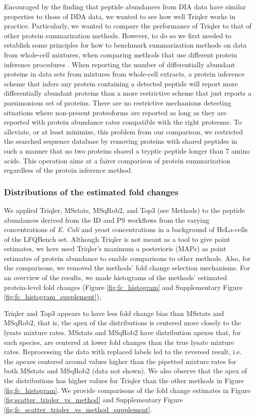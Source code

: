 \documentclass[10pt,letterpaper]{article}
\begin{document}
Encouraged by the finding that peptide abundances from DIA data have similar properties to those of DDA data, we wanted to see how well Triqler works in practice. Particularly, we wanted to compare the performance of Triqler to that of other protein summarization methods. However, to do so we first needed to establish some principles for how to benchmark summarization methods on data from whole-cell mixtures, when comparing methods that use different protein inference procedures \cite{serang2012recognizing}. When reporting the number of differentially abundant proteins in data sets from mixtures from whole-cell extracts, a protein inference scheme that infers any protein containing a detected peptide will report more differentially abundant proteins than a more restrictive scheme that just reports a parsimonious set of proteins. There are no restrictive mechanisms detecting situations where non-present proteoforms are reported as long as they are reported with protein abundance rates compatible with the right proteome. To alleviate, or at least minimize, this problem from our comparison, we restricted the searched sequence database by removing proteins with shared peptides in such a manner that no two proteins shared a tryptic peptide longer than 7 amino acids. This operation aims at a fairer comparison of protein summarization regardless of the protein inference method. 

\subsubsection*{Distributions of the estimated fold changes}

We applied Triqler, MSstats, MSqRob2, and Top3 (see Methods) to the peptide abundances derived from the ID and PS workflows from the varying concentrations of {\em E. Coli} and yeast concentrations in a background of HeLa-cells of the LFQBench set. Although Triqler is not meant as a tool to give point estimates, we here used Triqler's maximum a posterioris (MAPs) as point estimates of protein abundance to enable comparisons to other methods. Also, for the comparisons, we removed the methods' fold change selection mechanisms. For an overview of the results, we made histograms of the methods' estimated protein-level fold changes (Figure \ref{fig:fc_histogram} and Supplementary Figure \ref{fig:fc_histogram_supplement}), 

Triqler and Top3 appears to have less fold change bias than MSstats and MSqRob2, that is, the apex of the distributions is centered more closely to the lysate mixture rates. MSstats and MSqRob2 have distribution apexes that, for each species, are centered at lower fold changes than the true lysate mixture rates. Reprocessing the data with replaced labels led to the reversed result, i.e. the apexes centered around values higher than the pipetted mixture rates for both MSstats and MSqRob2 (data not shown). We also observe that the apex of the distributions has higher values for Triqler than the other methods in Figure \ref{fig:fc_histogram}. We provide comparisons of the fold change estimates in Figure \ref{fig:scatter_triqler_vs_method} and Supplementary Figure \ref{fig:fc_scatter_triqler_vs_method_supplement}.
\end{document}
